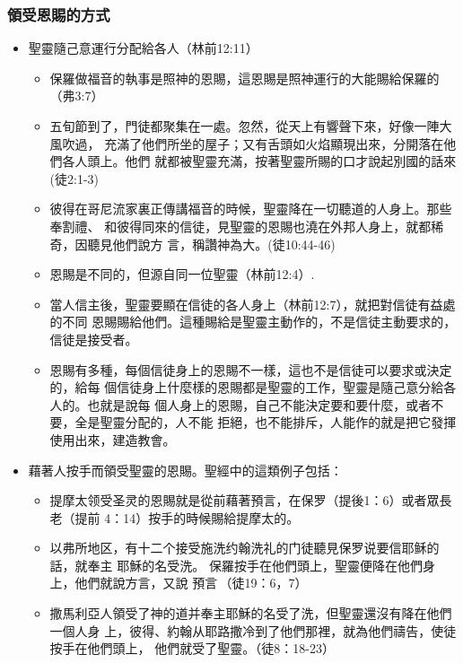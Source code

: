 \subsubsection{領受恩賜的方式}
\begin{itemize}
\item 聖靈隨己意運行分配給各人（林前12:11）
\begin{itemize}
\item 保羅做福音的執事是照神的恩賜，這恩賜是照神運行的大能賜給保羅的（弗3:7）
\item 五旬節到了，門徒都聚集在一處。忽然，從天上有響聲下來，好像一陣大風吹過，
充滿了他們所坐的屋子；又有舌頭如火焰顯現出來，分開落在他們各人頭上。他們
就都被聖靈充滿，按著聖靈所賜的口才說起別國的話來(徒2:1-3)
\item 彼得在哥尼流家裏正傳講福音的時候，聖靈降在一切聽道的人身上。那些奉割禮、
和彼得同來的信徒，見聖靈的恩賜也澆在外邦人身上，就都稀奇，因聽見他們說方
言，稱讚神為大。(徒10:44-46)
\item 恩賜是不同的，但源自同一位聖靈（林前12:4）.
\item 當人信主後，聖靈要顯在信徒的各人身上（林前12:7），就把對信徒有益處的不同
恩賜賜給他們。這種賜給是聖靈主動作的，不是信徒主動要求的，信徒是接受者。
\item 恩賜有多種，每個信徒身上的恩賜不一樣，這也不是信徒可以要求或決定的，給每
個信徒身上什麼樣的恩賜都是聖靈的工作，聖靈是隨己意分給各人的。也就是說每
個人身上的恩賜，自己不能決定要和要什麼，或者不要，全是聖靈分配的，人不能
拒絕，也不能排斥，人能作的就是把它發揮使用出來，建造教會。
\end{itemize}

\item 藉著人按手而領受聖靈的恩賜。聖經中的這類例子包括：

\begin{itemize}
\item 提摩太领受圣灵的恩賜就是從前藉著預言，在保罗（提後1：6）或者眾長老（提前
4：14）按手的時候賜給提摩太的。
\item 以弗所地区，有十二个接受施洗约翰洗礼的门徒聽見保罗说要信耶稣的話，就奉主
耶穌的名受洗。 保羅按手在他們頭上，聖靈便降在他們身上，他們就說方言，又說
預言 （徒19：6，7）
\item 撒馬利亞人領受了神的道并奉主耶穌的名受了洗，但聖靈還沒有降在他們一個人身
上，彼得、約翰从耶路撒冷到了他們那裡，就為他們禱告，使徒按手在他們頭上，
他們就受了聖靈。（徒8：18-23）
\end{itemize}
\end{itemize}

